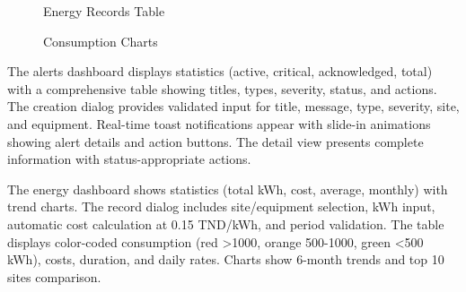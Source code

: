 \begin{figure}[H]
\centering
\begin{minipage}{0.48\textwidth}
\centering
{}
\caption{Energy Records Table}
\end{minipage}
\hfill
\begin{minipage}{0.48\textwidth}
\centering
{}
\caption{Consumption Charts}
\end{minipage}
\end{figure}

The alerts dashboard displays statistics (active, critical, acknowledged, total) with a comprehensive table showing titles, types, severity, status, and actions. The creation dialog provides validated input for title, message, type, severity, site, and equipment. Real-time toast notifications appear with slide-in animations showing alert details and action buttons. The detail view presents complete information with status-appropriate actions.

The energy dashboard shows statistics (total kWh, cost, average, monthly) with trend charts. The record dialog includes site/equipment selection, kWh input, automatic cost calculation at 0.15 TND/kWh, and period validation. The table displays color-coded consumption (red >1000, orange 500-1000, green <500 kWh), costs, duration, and daily rates. Charts show 6-month trends and top 10 sites comparison.

